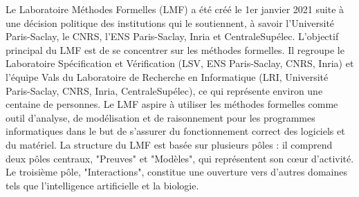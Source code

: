 \documentclass[titlepage,draft]{article}
\begin{document}
Le Laboratoire Méthodes Formelles (LMF) a été créé le 1er janvier 2021 suite à une décision politique des institutions qui le soutiennent, à savoir l'Université Paris-Saclay, le CNRS, l'ENS Paris-Saclay, Inria et CentraleSupélec. L'objectif principal du LMF est de se concentrer sur les méthodes formelles. Il regroupe le Laboratoire Spécification et Vérification (LSV, ENS Paris-Saclay, CNRS, Inria) et l'équipe Vals du Laboratoire de Recherche en Informatique (LRI, Université Paris-Saclay, CNRS, Inria, CentraleSupélec), ce qui représente environ une centaine de personnes.
Le LMF aspire à utiliser les méthodes formelles comme outil d'analyse, de modélisation et de raisonnement pour les programmes informatiques dans le but de s'assurer du fonctionnement correct des logiciels et du matériel.
La structure du LMF est basée sur plusieurs pôles : il comprend deux pôles centraux, "Preuves" et "Modèles", qui représentent son cœur d'activité. Le troisième pôle, "Interactions", constitue une ouverture vers d'autres domaines tels que l'intelligence artificielle et la biologie.
\end{document}

